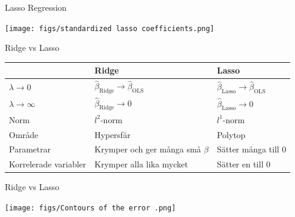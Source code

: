 \documentclass[10pt,english]{beamer}
\begin{document}
\begin{frame}{Lasso Regression}
    
    \texttt{[image: figs/standardized lasso coefficients.png]}

\end{frame}

\begin{frame}{Ridge vs Lasso}
    \begin{tabular}{lll}
        & Ridge & Lasso \\ \hline
        $\lambda \to 0$ & $\hat{\beta}_{\text{Ridge}} \to \hat{\beta}_{\text{OLS}}$ & $\hat{\beta}_{\text{Lasso}} \to \hat{\beta}_{\text{OLS}}$ \\
        $\lambda \to \infty$ &  $\hat{\beta}_{\text{Ridge}} \to 0$ &  $\hat{\beta}_{\text{Lasso}} \to 0$ \\
        Norm & $l^2$-norm & $l^1$-norm \\
        Område & Hypersfär & Polytop \\
        Parametrar & Krymper och ger många små $\beta$ & Sätter många till 0 \\
        Korrelerade variabler & Krymper alla lika mycket & Sätter en till 0
    \end{tabular}
\end{frame}

\begin{frame}{Ridge vs Lasso}

    \texttt{[image: figs/Contours of the error .png]}
    
\end{frame}
\end{document}
